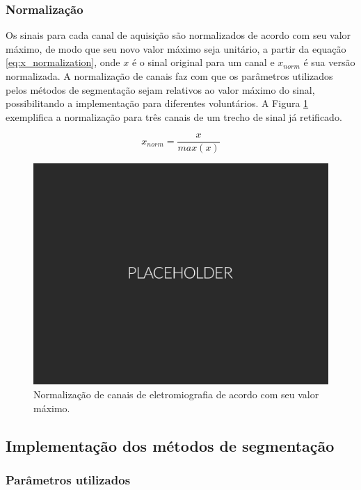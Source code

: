 \subsubsection{Normalização}

Os sinais para cada canal de aquisição são normalizados de acordo com seu valor máximo, de modo que seu novo valor máximo seja unitário, a partir da equação \ref{eq:x_normalization}, onde $x$ é o sinal original para um canal e $x_{norm}$ é sua versão normalizada. A normalização de canais faz com que os parâmetros utilizados pelos métodos de segmentação sejam relativos ao valor máximo do sinal, possibilitando a implementação para diferentes voluntários. A Figura \ref{fig:normalization} exemplifica a normalização para três canais de um trecho de sinal já retificado.

\begin{equation}
	\label{eq:x_normalization}
	x_{norm} = \frac{x}{max(x)}
\end{equation}

\begin{figure}[htb]
	\caption{\label{fig:normalization}Normalização de canais de eletromiografia de acordo com seu valor máximo.}
	\begin{center}
	    \includegraphics[width=0.75\linewidth]{./img/placeholder.png}
	\end{center}
\end{figure}


\subsection{Implementação dos métodos de segmentação}
\subsubsection{Parâmetros utilizados}

